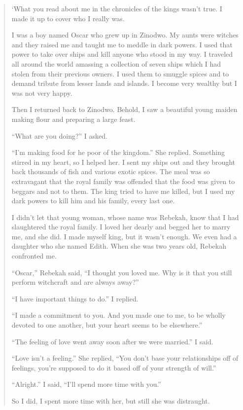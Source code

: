 \begin{quote}
`What you read about me in the chronicles of the kings wasn't true. I made it up to cover who I really was.

I was a boy named Oscar who grew up in Zi\-no\-dwo.
My aunts were witches and they raised me and taught me to meddle in dark powers.
I used that power to take over ships and kill anyone who stood in my way.
I traveled all around the world amassing a collection of seven ships which I had stolen from their previous owners.
I used them to smuggle spices and to demand tribute from lesser lands and islands.
I become very wealthy but I was not very happy.

Then I returned back to Zi\-no\-dwo.
Behold, I saw a beautiful young maiden making flour and preparing a large feast.

``What are you doing?'' I asked.

``I'm making food for he poor of the kingdom.'' She replied.
Something stirred in my heart, so I helped her.
I sent my ships out and they brought back thousands of fish and various exotic spices.
The meal was so extravagant that the royal family was offended that the food was given to beggars and not to them.
The king tried to have me killed, but I used my dark powers to kill him and his family, every last one.

I didn't let that young woman, whose name was Rebekah, know that I had slaughtered the royal family.
I loved her dearly and begged her to marry me, and she did.
I made myself king, but it wasn't enough.
We even had a daughter who she named Edith. When she was two years old, Rebekah confronted me.

``Oscar,'' Rebekah said, ``I thought you loved me.
Why is it that you still perform witchcraft and are always away?''

``I have important things to do.'' I replied.

``I made a commitment to you. And you made one to me, to be wholly devoted to one another, but your heart seems to be elsewhere.''

``The feeling of love went away soon after we were married.'' I said.

``Love isn't a feeling.'' She replied, ``You don't base your relationships off of feelings, you're supposed to do it based off of your strength of will.''

``Alright.'' I said, ``I'll spend more time with you.''

So I did, I spent more time with her, but still she was distraught.


\end{quote}
